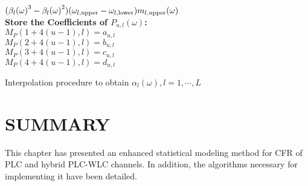 \begin{algorithm}[h!]
{{{				$({\beta_{l}(\omega)}^3-{\beta_{l}(\omega)}^2)(\omega_{l,\textnormal{upper}}-\omega_{l,\textnormal{lower}})m_{l,\textnormal{upper}}(\omega)$\\
				\textbf{Store the Coefficients of $P_{u,l}(\omega)$:}\\
				$M_{P}(1+4(u-1),l) = a_{u,l}$\\
				$M_{P}(2+4(u-1),l) = b_{u,l}$\\
				$M_{P}(3+4(u-1),l) = c_{u,l}$\\
				$M_{P}(4+4(u-1),l) = d_{u,l}$\\
			}
		}	
	}	
	\caption{Interpolation procedure to obtain $\alpha_l(\omega), l=1,\cdots,L$} 
	\label{Algo2}	
\end{algorithm}

\section{SUMMARY} \label{sec:P3}

This chapter has presented an enhanced statistical modeling method for \ac{CFR} of \ac{PLC} and hybrid \ac{PLC}-\ac{WLC} channels. In addition, the algorithms necessary for implementing it have been detailed.